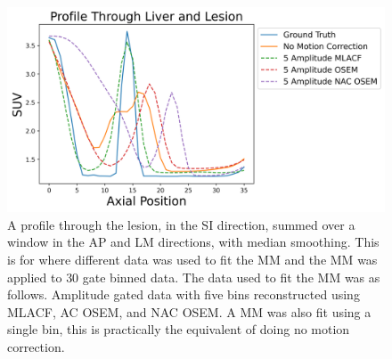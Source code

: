             \begin{figure}
                \centering
                
                \includegraphics[width=1.0\linewidth]{figures/motion_correction_2_results_2_5_amplitude_profile.png}
                
                \captionsetup{singlelinecheck=false}
                \caption{
                    A profile through the lesion, in the \gls{SI} direction, summed over a window in the \gls{AP} and \gls{LM} directions, with median smoothing. This is for where different data was used to fit the \gls{MM} and the \gls{MM} was applied to $30$ gate binned data. The data used to fit the \gls{MM} was as follows. Amplitude gated data with five bins reconstructed using \gls{MLACF}, \gls{AC} \gls{OSEM}, and \gls{NAC} \gls{OSEM}. A \gls{MM} was also fit using a single bin, this is practically the equivalent of doing no motion correction.
                }
                
                \label{fig:evaluation_of_pet_ct_motion_correction_incorporating_motion_models_using_mlacf_and_complex_gating_schemes_results_5_amplitude_profile}
            \end{figure}

